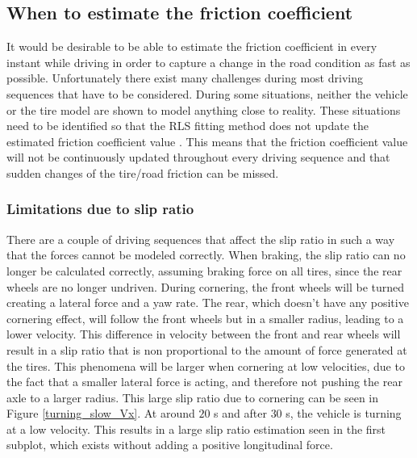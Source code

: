 \subsection{When to estimate the friction coefficient}
\label{when_to_estimate}
It would be desirable to be able to estimate the friction coefficient in every instant while driving in order to capture a change in the road condition as fast as possible. Unfortunately there exist many challenges during most driving sequences that have to be considered. During some situations, neither the vehicle or the tire model are shown to model anything close to reality. These situations need to be identified so that the RLS fitting method does not update the estimated friction coefficient value . This means that the friction coefficient value will not be continuously updated throughout every driving sequence and that sudden changes of the tire/road friction can be missed.

\subsubsection{Limitations due to slip ratio}
There are a couple of driving sequences that affect the slip ratio in such a way that the forces cannot be modeled correctly. When braking, the slip ratio can no longer be calculated correctly, assuming braking force on all tires, since the rear wheels are no longer undriven. During cornering, the front wheels will be turned creating a lateral force and a yaw rate. The rear, which doesn't have any positive cornering effect, will follow the front wheels but in a smaller radius, leading to a lower velocity. This difference in velocity between the front and rear wheels will result in a slip ratio that is non proportional to the amount of force generated at the tires. This phenomena will be larger when cornering at low velocities, due to the fact that a smaller lateral force is acting, and therefore not pushing the rear axle to a larger radius. This large slip ratio due to cornering can be seen in Figure \ref{turning_slow_Vx}. At around $ 20 $ s and after $ 30 $ s, the vehicle is turning at a low velocity. This results in a large slip ratio estimation seen in the first subplot, which exists without adding a positive longitudinal force.

